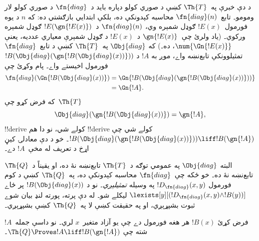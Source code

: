 \documentclass[../../../include/open-logic-section]{subfiles}
\begin{document}
\begin{explain}
د دې خبرې په~$\Th{T}$ کښې د صوري کولو دپاره بايد د~$\fn{diag}$
د صوري کولو لار ومومو۔ تابع~$\fn{diag}(n)$ محاسبه کېدونکې ده، بلکې
ابتدايي بازګشتي ده: که $n$ د يوه فورمول~$!E(x)$ ګوډل شمېره وي،
$\fn{diag}(n)$ د~$!E(\gn{!E(x)})$ ګوډل شمېره ورکوي۔ (ياد ولرئ
چې~$\gn{!E(x)}$ د~$!E(x)$ د ګوډل شمېرې معياري عدديه، يعنې
$\num{\Gn{!E(x)}}$، ده۔) که $\Obj{diag}$ په~$\Th{T}$ کښې د
تابع~$\fn{diag}$ تمثيلوونکې تابع‌نښه واے، موږ به $!A$ د
$!B(\Obj{diag}(\gn{!B(\Obj{diag}(x))}))$ فورمول اخيستے واے۔
پام وکړئ چې
\begin{align*}
\fn{diag}(\Gn{!B(\Obj{diag}(x))}) & =
\Gn{!B(\Obj{diag}(\gn{!B(\Obj{diag}(x))}))} \\
& = \Gn{!A}.
\end{align*}
که فرض کړو چې~$\Th{T}$
\[
\Obj{diag}(\gn{!B(\Obj{diag}(x))}) = \gn{!A},
\]
!!{derive} کولے شي، نو دا هم !!{derive} کولے شي چې
$!B(\Obj{diag}(\gn{!B(\Obj{diag}(x))}))
\liff !B(\gn{!A})$۔ خو د دې معادلۍ کيڼ اړخ د تعريف له مخې~$!A$
دے۔

البته $\Obj{diag}$ په عمومي توګه د~$\Th{T}$ تابع‌نښه نۀ ده، او
يقيناً د~$\Th{Q}$ تابع‌نښه نۀ ده۔ خو ځکه چې~$\fn{diag}$ محاسبه
کېدونکې ده، په~$\Th{Q}$ کښې د کوم فورمول
$!D_{\fn{diag}}(x,y)$ په وسيله \emph{تمثيلېږي}۔ نو د
$!B(\Obj{diag}(x))$ پر ځاے
$\lexists[y][(!D_{\fn{diag}}(x,y) \land !B(y))]$ ليکلے شو۔
له دې پرته، پورته لنډ بيان شوے ثبوت بشپړېږي، او په حقيقت کښې
لا په~$\Th{Q}$ کښې بشپړېږي۔
\end{explain}

\begin{lem}
 فرض کړئ $!B(x)$ هر هغه فورمول دے چې
يو آزاد متغير~$x$ لري۔ نو داسې جمله~$!A$ شته چې
$\Th{Q} \Proves !A \liff !B(\gn{!A})$۔
\end{lem}
\end{document}
